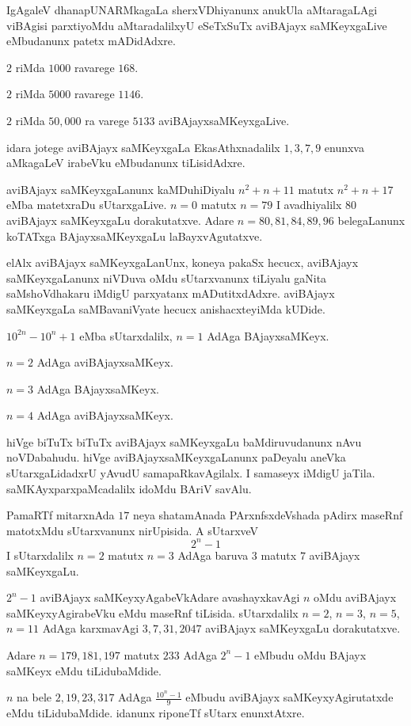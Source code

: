 IgAgaleV dhanapUNARMkagaLa sherxVDhiyanunx anukUla aMtaragaLAgi viBAgisi parxtiyoMdu aMtaradalilxyU eSeTxSuTx aviBAjayx saMKeyxgaLive eMbudanunx patetx mADidAdxre.

$2$ riMda $1000$ ravarege $168$.
 
$2$ riMda $5000$ ravarege $1146$. 

$2$ riMda $50,000$ ra varege $5133$ aviBAjayxsaMKeyxgaLive.

idara jotege aviBAjayx saMKeyxgaLa EkasAthxnadalilx $1,3,7,9$ enunxva aMkagaLeV irabeVku eMbudanunx tiLisidAdxre.

aviBAjayx saMKeyxgaLanunx kaMDuhiDiyalu $n^2+n+11$ matutx $n^2+n+17$ eMba matetxraDu sUtarxgaLive. $n=0$ matutx $n=79$ I avadhiyalilx $80$ aviBAjayx saMKeyxgaLu dorakutatxve. Adare $n=80,81,84,89,96$ belegaLanunx koTATxga BAjayxsaMKeyxgaLu laBayxvAgutatxve.

elAlx aviBAjayx saMKeyxgaLanUnx, koneya pakaSx hecucx, aviBAjayx saMKeyxgaLanunx niVDuva oMdu sUtarxvanunx tiLiyalu gaNita saMshoVdhakaru iMdigU parxyatanx mADutitxdAdxre. aviBAjayx saMKeyxgaLa saMBavaniVyate hecucx anishacxteyiMda kUDide.

$10^{2n}-10^n+1$ eMba sUtarxdalilx, $n=1$ AdAga BAjayxsaMKeyx. 

$n=2$ AdAga aviBAjayxsaMKeyx.

$n=3$ AdAga BAjayxsaMKeyx.

$n=4$ AdAga aviBAjayxsaMKeyx.

hiVge biTuTx biTuTx aviBAjayx saMKeyxgaLu baMdiruvudanunx nAvu noVDabahudu. hiVge aviBAjayxsaMKeyxgaLanunx paDeyalu aneVka sUtarxgaLidadxrU yAvudU samapaRka\-vAgilalx. I samaseyx iMdigU jaTila. saMKAyxparxpaMcadalilx idoMdu BAriV savAlu.

PamaRTf mitarxnAda $17$ neya shatamAnada PArxnfsxdeVshada pAdirx maseRnf matotxMdu sUtarxvanunx nirUpisida. A sUtarxveV 
$$
2^n-1
$$
I sUtarxdalilx $n=2$ matutx $n=3$ AdAga baruva $3$ matutx $7$ aviBAjayx saMKeyxgaLu.

$2^n-1$ aviBAjayx saMKeyxyAgabeVkAdare avashayxkavAgi $n$ oMdu aviBAjayx saMKeyxyAgirabeVku eMdu maseRnf tiLisida. sUtarxdalilx $n=2$, $n=3$, $n=5$, $n=11$ AdAga karxmavAgi $3,7,31,2047$ aviBAjayx saMKeyxgaLu dorakutatxve.

Adare $n= 179,181,197$ matutx $233$ AdAga $2^{n}-1$ eMbudu oMdu BAjayx saMKeyx eMdu tiLidubaMdide.

$n$ na bele $2,19,23,317$ AdAga $\frac{10^n-1}{9}$ eMbudu aviBAjayx saMKeyxyAgiru\-tatxde eMdu tiLidubaMdide. idanunx riponeTf sUtarx enunxtAtxre.

